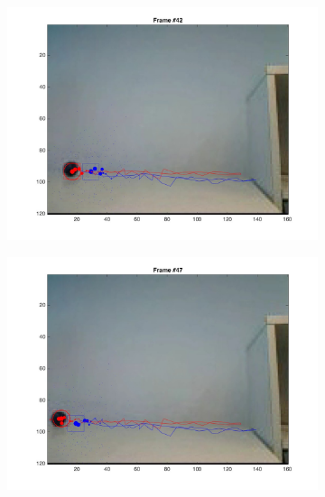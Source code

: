 \documentclass{ethz_report}
\begin{document}
\begin{figure}[h]
\begin{subfigure}[b]{.25\textwidth}
        \includegraphics[width=1\linewidth]{images/video3_model_41}
    \end{subfigure}%
    \begin{subfigure}[b]{.25\textwidth}
        \centering
        \includegraphics[width=1\linewidth]{images/video3_model_46}
    \end{subfigure}%
    \begin{subfigure}[b]{.25\textwidth}
        \centering

\end{subfigure}
\end{figure}
\end{document}
